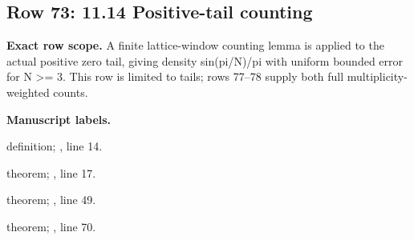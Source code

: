 \subsection{Row 73: 11.14 Positive-tail counting}
\label{row:73}
\textbf{Exact row scope.} A finite lattice-window counting lemma is applied to the actual positive zero tail, giving density sin(pi/N)/pi with uniform bounded error for N >= 3. This row is limited to tails; rows 77--78 supply both full multiplicity-weighted counts.\par\smallskip
\textbf{Manuscript labels.} \par\smallskip
{\small{}\par}
{\footnotesize\color{muted}definition; , line 14.\par}\smallskip
{\small{}\par}
{\footnotesize\color{muted}theorem; , line 17.\par}\smallskip
{\small{}\par}
{\footnotesize\color{muted}theorem; , line 49.\par}\smallskip
{\small{}\par}
{\footnotesize\color{muted}theorem; , line 70.\par}\smallskip
{}
